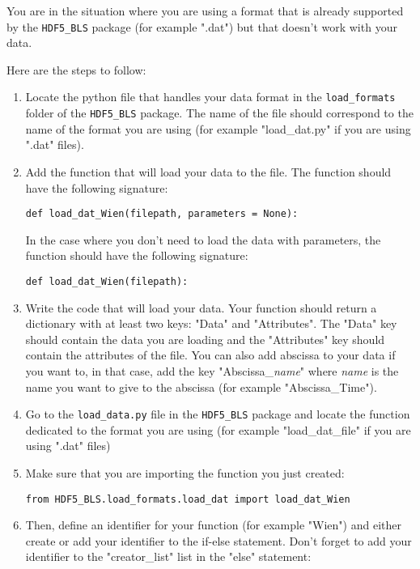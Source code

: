 \begin{tcolorbox}
    You are in the situation where you are using a format that is already supported by the \texttt{HDF5\_BLS} package (for example ".dat") but that doesn't work with your data.
\end{tcolorbox}

Here are the steps to follow:
\begin{enumerate}
    \item Locate the python file that handles your data format in the \texttt{load\_formats} folder of the \texttt{HDF5\_BLS} package. The name of the file should correspond to the name of the format you are using (for example "load\_dat.py" if you are using ".dat" files).
    \item Add the function that will load your data to the file. The function should have the following signature:
\begin{lstlisting}
def load_dat_Wien(filepath, parameters = None):
\end{lstlisting}
    In the case where you don't need to load the data with parameters, the function should have the following signature:
\begin{lstlisting}
def load_dat_Wien(filepath):
\end{lstlisting}
    \item Write the code that will load your data. Your function should return a dictionary with at least two keys: "Data" and "Attributes". The "Data" key should contain the data you are loading and the "Attributes" key should contain the attributes of the file. You can also add abscissa to your data if you want to, in that case, add the key "Abscissa\_\textsl{name}" where \textsl{name} is the name you want to give to the abscissa (for example "Abscissa\_Time").
    \item Go to the \texttt{load\_data.py} file in the \texttt{HDF5\_BLS} package and locate the function dedicated to the format you are using (for example "load\_dat\_file" if you are using ".dat" files)
    \item Make sure that you are importing the function you just created:
\begin{lstlisting}
from HDF5_BLS.load_formats.load_dat import load_dat_Wien
\end{lstlisting}
    \item Then, define an identifier for your function (for example "Wien") and either create or add your identifier to the if-else statement. Don't forget to add your identifier to the "creator\_list" list in the "else" statement:

\end{enumerate}
